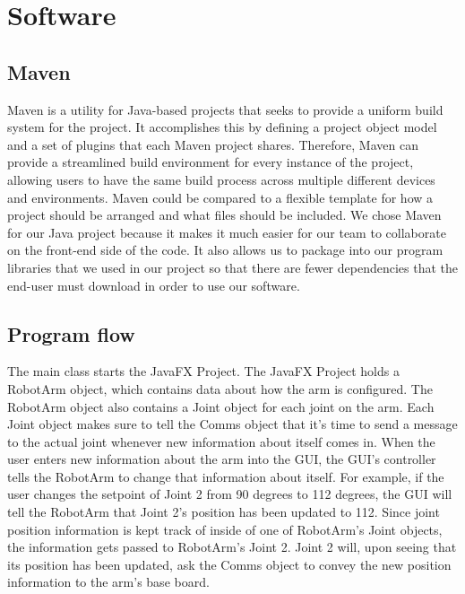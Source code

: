 
\section{Software}

\subsection{Maven}
Maven is a utility for Java-based projects that seeks to provide a uniform build system for the project. It accomplishes this by defining a project object model and a set of plugins that each Maven project shares. Therefore, Maven can provide a streamlined build environment for every instance of the project, allowing users to have the same build process across multiple different devices and environments. Maven could be compared to a flexible template for how a project should be arranged and what files should be included. We chose Maven for our Java project because it makes it much easier for our team to collaborate on the front-end side of the code.  It also allows us to package into our program libraries that we used in our project so that there are fewer dependencies that the end-user must download in order to use our software.

\subsection{Program flow}
The main class starts the JavaFX Project. The JavaFX Project holds a RobotArm object, which contains data about how the arm is configured. The RobotArm object also contains a Joint object for each joint on the arm. Each Joint object makes sure to tell the Comms object that it's time to send a message to the actual joint whenever new information about itself comes in. When the user enters new information about the arm into the GUI, the GUI's controller tells the RobotArm to change that information about itself. For example, if the user changes the setpoint of Joint 2 from 90 degrees to 112 degrees, the GUI will tell the RobotArm that Joint 2's position has been updated to 112. Since joint position information is kept track of inside of one of RobotArm's Joint objects, the information gets passed to RobotArm's Joint 2. Joint 2 will, upon seeing that its position has been updated, ask the Comms object to convey the new position information to the arm's base board.
\noindent 

